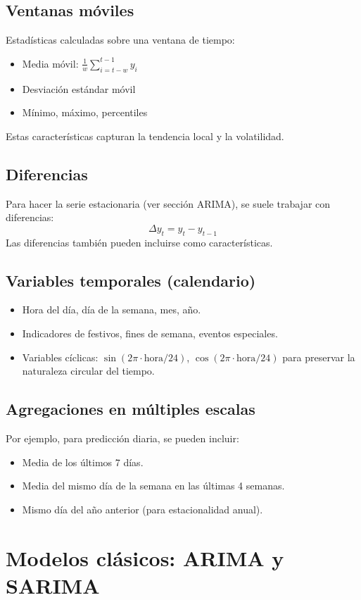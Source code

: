 \documentclass[12pt,a4paper,openany,oneside]{book}
\begin{document}
\subsection{Ventanas móviles}
Estadísticas calculadas sobre una ventana de tiempo:
\begin{itemize}
    \item Media móvil: \(\frac{1}{w}\sum_{i=t-w}^{t-1} y_i\)
    \item Desviación estándar móvil
    \item Mínimo, máximo, percentiles
\end{itemize}
Estas características capturan la tendencia local y la volatilidad.

\subsection{Diferencias}
Para hacer la serie estacionaria (ver sección ARIMA), se suele trabajar con diferencias:
\[
\Delta y_t = y_t - y_{t-1}
\]
Las diferencias también pueden incluirse como características.

\subsection{Variables temporales (calendario)}
\begin{itemize}
    \item Hora del día, día de la semana, mes, año.
    \item Indicadores de festivos, fines de semana, eventos especiales.
    \item Variables cíclicas: \(\sin(2\pi \cdot \text{hora}/24)\), \(\cos(2\pi \cdot \text{hora}/24)\) para preservar la naturaleza circular del tiempo.
\end{itemize}

\subsection{Agregaciones en múltiples escalas}
Por ejemplo, para predicción diaria, se pueden incluir:
\begin{itemize}
    \item Media de los últimos 7 días.
    \item Media del mismo día de la semana en las últimas 4 semanas.
    \item Mismo día del año anterior (para estacionalidad anual).
\end{itemize}

\section{Modelos clásicos: ARIMA y SARIMA}
\end{document}
